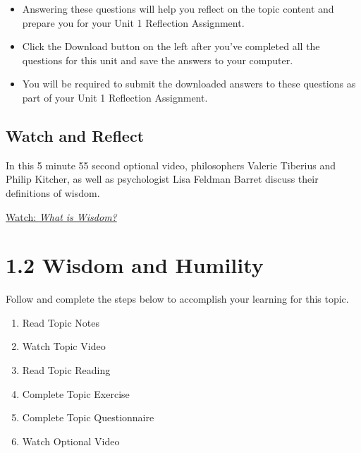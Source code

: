 \documentclass[
]{book}
\providecommand{\tightlist}{%
  \setlength{\itemsep}{0pt}\setlength{\parskip}{0pt}}
\begin{document}
\begin{reflect}
\begin{itemize}
\tightlist
\item
  Answering these questions will help you reflect on the topic content and prepare you for your Unit 1 Reflection Assignment.
\item
  Click the Download button on the left after you've completed all the questions for this unit and save the answers to your computer.
\item
  You will be required to submit the downloaded answers to these questions as part of your Unit 1 Reflection Assignment.
\end{itemize}
\end{reflect}

\hypertarget{watch-and-reflect-1}{%
\subsection*{Watch and Reflect}\label{watch-and-reflect-1}}

\begin{reflect}
In this 5 minute 55 second optional video, philosophers Valerie Tiberius and Philip Kitcher, as well as psychologist Lisa Feldman Barret discuss their definitions of wisdom.

\href{https://youtu.be/obqedyeUcwk}{Watch: \emph{What is Wisdom?}}
\end{reflect}

\hypertarget{wisdom-and-humility}{%
\section*{1.2 Wisdom and Humility}\label{wisdom-and-humility}}

Follow and complete the steps below to accomplish your learning for this topic.

\begin{enumerate}
\def\labelenumi{\arabic{enumi}.}
\tightlist
\item
  Read Topic Notes
\item
  Watch Topic Video
\item
  Read Topic Reading
\item
  Complete Topic Exercise
\item
  Complete Topic Questionnaire
\item
  Watch Optional Video
\end{enumerate}
\end{document}
